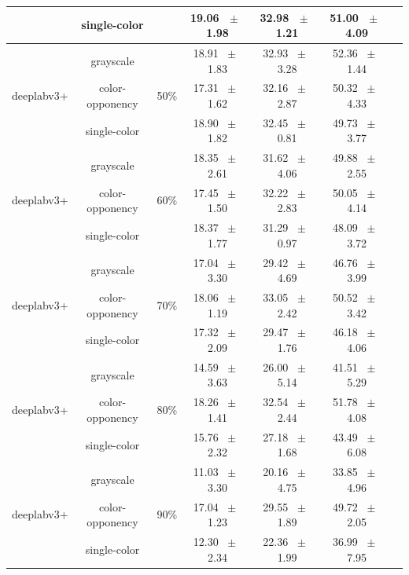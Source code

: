 \begin{table}[h]
\begin{tabular}{@{}lccc ccc@{}}
    & single-color &  & 19.06 ~$\pm$~ 1.98 & 32.98 ~$\pm$~ 1.21 & 51.00 ~$\pm$~ 4.09 \\
    \midrule
    \multirow{3}{*}{deeplabv3+} & grayscale & \multirow{3}{*}{50\%} & 18.91 ~$\pm$~ 1.83 & 32.93 ~$\pm$~ 3.28 & 52.36 ~$\pm$~ 1.44 \\
    & color-opponency &  & 17.31 ~$\pm$~ 1.62 & 32.16 ~$\pm$~ 2.87 & 50.32 ~$\pm$~ 4.33 \\
    & single-color &  & 18.90 ~$\pm$~ 1.82 & 32.45 ~$\pm$~ 0.81 & 49.73 ~$\pm$~ 3.77 \\
    \midrule
    \multirow{3}{*}{deeplabv3+} & grayscale & \multirow{3}{*}{60\%} & 18.35 ~$\pm$~ 2.61 & 31.62 ~$\pm$~ 4.06 & 49.88 ~$\pm$~ 2.55 \\
    & color-opponency &  & 17.45 ~$\pm$~ 1.50 & 32.22 ~$\pm$~ 2.83 & 50.05 ~$\pm$~ 4.14 \\
    & single-color &  & 18.37 ~$\pm$~ 1.77 & 31.29 ~$\pm$~ 0.97 & 48.09 ~$\pm$~ 3.72 \\
    \midrule
    \multirow{3}{*}{deeplabv3+} & grayscale & \multirow{3}{*}{70\%} & 17.04 ~$\pm$~ 3.30 & 29.42 ~$\pm$~ 4.69 & 46.76 ~$\pm$~ 3.99 \\
    & color-opponency &  & 18.06 ~$\pm$~ 1.19 & 33.05 ~$\pm$~ 2.42 & 50.52 ~$\pm$~ 3.42 \\
    & single-color &  & 17.32 ~$\pm$~ 2.09 & 29.47 ~$\pm$~ 1.76 & 46.18 ~$\pm$~ 4.06 \\
    \midrule
    \multirow{3}{*}{deeplabv3+} & grayscale & \multirow{3}{*}{80\%} & 14.59 ~$\pm$~ 3.63 & 26.00 ~$\pm$~ 5.14 & 41.51 ~$\pm$~ 5.29 \\
    & color-opponency &  & 18.26 ~$\pm$~ 1.41 & 32.54 ~$\pm$~ 2.44 & 51.78 ~$\pm$~ 4.08 \\
    & single-color &  & 15.76 ~$\pm$~ 2.32 & 27.18 ~$\pm$~ 1.68 & 43.49 ~$\pm$~ 6.08 \\
    \midrule
    \multirow{3}{*}{deeplabv3+} & grayscale & \multirow{3}{*}{90\%} & 11.03 ~$\pm$~ 3.30 & 20.16 ~$\pm$~ 4.75 & 33.85 ~$\pm$~ 4.96 \\
    & color-opponency &  & 17.04 ~$\pm$~ 1.23 & 29.55 ~$\pm$~ 1.89 & 49.72 ~$\pm$~ 2.05 \\
    & single-color &  & 12.30 ~$\pm$~ 2.34 & 22.36 ~$\pm$~ 1.99 & 36.99 ~$\pm$~ 7.95 \\
    \midrule
    \bottomrule
  \end{tabular}
  \label{tab:sparse_results_deeplabv3+_dark_zurich}
\end{table}